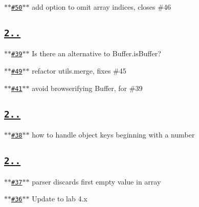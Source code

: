 \begin{DoxyItemize}
\item \href{https://github.com/ljharb/qs/issues/50}{\tt $\ast$$\ast$\#50$\ast$$\ast$} add option to omit array indices, closes \#46
\end{DoxyItemize}

\subsection*{\href{https://github.com/ljharb/qs/issues?milestone=14&state=closed}{\tt {\bfseries 2..}}}


\begin{DoxyItemize}
\item \href{https://github.com/ljharb/qs/issues/39}{\tt $\ast$$\ast$\#39$\ast$$\ast$} Is there an alternative to Buffer.\+is\+Buffer?
\item \href{https://github.com/ljharb/qs/issues/49}{\tt $\ast$$\ast$\#49$\ast$$\ast$} refactor utils.\+merge, fixes \#45
\item \href{https://github.com/ljharb/qs/issues/41}{\tt $\ast$$\ast$\#41$\ast$$\ast$} avoid browserifying Buffer, for \#39
\end{DoxyItemize}

\subsection*{\href{https://github.com/ljharb/qs/issues?milestone=13&state=closed}{\tt {\bfseries 2..}}}


\begin{DoxyItemize}
\item \href{https://github.com/ljharb/qs/issues/38}{\tt $\ast$$\ast$\#38$\ast$$\ast$} how to handle object keys beginning with a number
\end{DoxyItemize}

\subsection*{\href{https://github.com/ljharb/qs/issues?milestone=12&state=closed}{\tt {\bfseries 2..}}}


\begin{DoxyItemize}
\item \href{https://github.com/ljharb/qs/issues/37}{\tt $\ast$$\ast$\#37$\ast$$\ast$} parser discards first empty value in array
\item \href{https://github.com/ljharb/qs/issues/36}{\tt $\ast$$\ast$\#36$\ast$$\ast$} Update to lab 4.\+x
\end{DoxyItemize}

